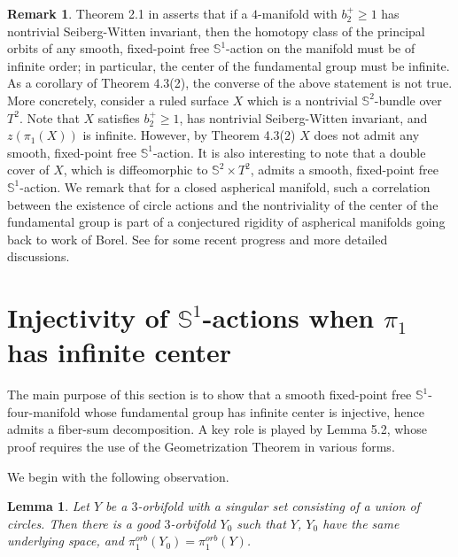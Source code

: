\documentclass[11pt]{amsart}
\theoremstyle{plain}
\numberwithin{theorem}{section}
\newtheorem{lemma}[theorem]{Lemma}
\theoremstyle{definition}
\newtheorem{remark}[theorem]{Remark}
\begin{document}
\begin{remark} 
Theorem 2.1 in \cite{C2} asserts that if a $4$-manifold with $b_2^{+}\geq 1$ has nontrivial
Seiberg-Witten invariant, then the homotopy class of the principal orbits of any smooth,
fixed-point free ${{\mathbb S}}^1$-action on the manifold must be of infinite order; in particular, the center
of the fundamental group must be infinite. As a corollary of Theorem 4.3(2), the converse of the above statement is not true. More concretely, consider a ruled surface $X$
which is a nontrivial ${{\mathbb S}}^2$-bundle over $T^2$. Note that $X$ satisfies $b_2^{+}\geq 1$, has
nontrivial Seiberg-Witten invariant, and $z(\pi_1(X))$ is infinite. However, by Theorem 4.3(2) $X$ does not admit any smooth, fixed-point free ${{\mathbb S}}^1$-action. It is also interesting to note that
a double cover of $X$, which is diffeomorphic to ${{\mathbb S}}^2\times T^2$, admits a smooth,
fixed-point free ${{\mathbb S}}^1$-action. We remark that for a closed aspherical manifold, such a correlation between the existence of circle actions and the nontriviality of the center of the fundamental group is part of a conjectured rigidity of aspherical manifolds going back to work of Borel. See \cite{CWY} for some recent progress and more detailed discussions.

\end{remark}

\section{Injectivity of ${{\mathbb S}}^1$-actions when $\pi_1$ has infinite center}

The main purpose of this section is to show that a smooth fixed-point free ${{\mathbb S}}^1$-four-manifold whose 
fundamental group has infinite center is injective, hence admits a fiber-sum decomposition. 
A key role is played by Lemma 5.2, whose proof requires the use of the Geometrization Theorem 
in various forms. 

We begin with the following observation. 

\begin{lemma}
Let $Y$ be a $3$-orbifold with a singular set consisting of a union of circles. Then
there is a good $3$-orbifold $Y_0$ such that $Y$, $Y_0$ have the same 
underlying space, and $\pi_1^{orb}(Y_0)=\pi_1^{orb}(Y)$.
\end{lemma}
\end{document}
